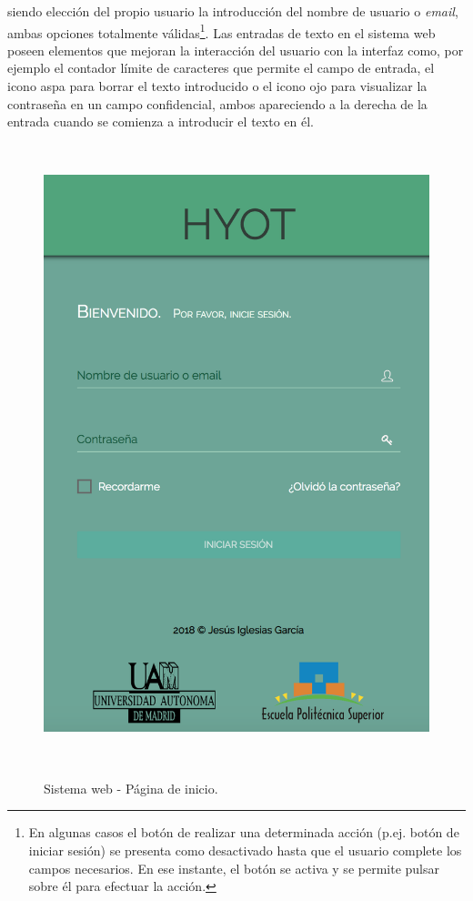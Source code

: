 \documentclass[12pt,a4paper, twoside]{report}
\begin{document}
	siendo elección del propio usuario la introducción del nombre de usuario o \textit{email}, ambas opciones totalmente válidas\footnote{En algunas casos el botón de realizar una determinada acción (p.ej. botón de iniciar sesión) se presenta como desactivado hasta que el usuario complete los campos necesarios. En ese instante, el botón se activa y se permite pulsar sobre él para efectuar la acción.}. Las entradas de texto en el sistema web poseen elementos que mejoran la interacción del usuario con la interfaz como, por ejemplo el contador límite de caracteres que permite el campo de entrada, el icono aspa para borrar el texto introducido o el icono ojo para visualizar la contraseña en un campo confidencial, ambos apareciendo a la derecha de la entrada cuando se comienza a introducir el texto en él.
		
	\begin{figure}[!ht]   
		\caption{Sistema web - Página de inicio.} 
		\begin{center} 
	 		\includegraphics[width=12cm, height=18cm]{Images/userGuide/web/homepage} \\
			\label{fig:web_homepage} 
		\end{center}  	
	\end{figure}	
	
\end{document}
